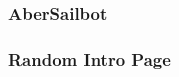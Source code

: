 \documentclass[12pt]{beamer}
\begin{document}
  \begin{frame}
    \frametitle{AberSailbot}
  \end{frame}
  
  \begin{frame}
    \frametitle{Random Intro Page}
  \end{frame}
  
\end{document}
